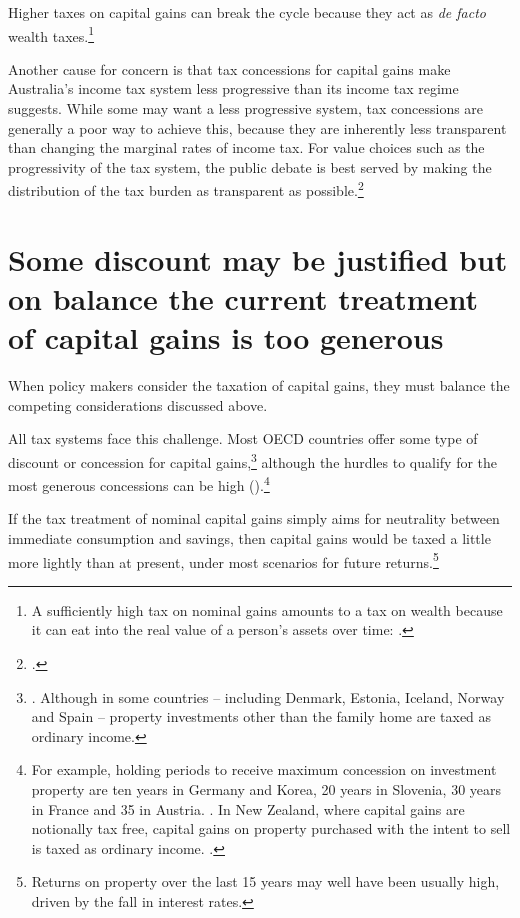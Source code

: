 \documentclass{grattanAlpha}\usepackage[]{graphicx}\usepackage[]{color}
\begin{document}
Higher taxes on capital gains can break the cycle because they act as \emph{de facto} wealth taxes.\footnote{A sufficiently high tax on nominal gains amounts to a tax on wealth because it can eat into the real value of a person's assets over time: \textcite{Cowen2013}.}

Another cause for concern is that tax concessions for capital gains make Australia’s income tax system less progressive than its income tax regime suggests. While some may want a less progressive system, tax concessions are generally a poor way to achieve this, because they are inherently less transparent than changing the marginal rates of income tax. For value choices such as the progressivity of the tax system, the public debate is best served by making the distribution of the tax burden as transparent as possible.\footcite[][19]{DaleyCoatesWoodEtAl2015Super}

\section{Some discount may be justified but on balance the current treatment of capital gains is too generous}
When policy makers consider the taxation of capital gains, they must balance the competing considerations discussed above. 

All tax systems face this challenge. Most OECD countries offer some type of discount or concession for capital gains,\footnote{\textcite{Harding2013}. Although in some countries – including Denmark, Estonia, Iceland, Norway and Spain – property investments other than the family home are taxed as ordinary income.} although the hurdles to qualify for the most generous concessions can be high ().\footnote{For example, holding periods to receive maximum concession on investment property are ten years in Germany and Korea, 20 years in Slovenia, 30 years in France and 35 in Austria. \textcite[See:][]{Harding2013}. In New Zealand, where capital gains are notionally tax free, capital gains on property purchased with the intent to sell is taxed as ordinary income. \textcite[][See:]{InlandRevenueNewZealand2015MistakingPropertyDealingForPropertyInvestment}.} 

If the tax treatment of nominal capital gains simply aims for neutrality between immediate consumption and savings, then capital gains would be taxed a little more lightly than at present, under most scenarios for future returns.\footnote{Returns on property over the last 15 years may well have been usually high, driven by the fall in interest rates.} 
\end{document}

